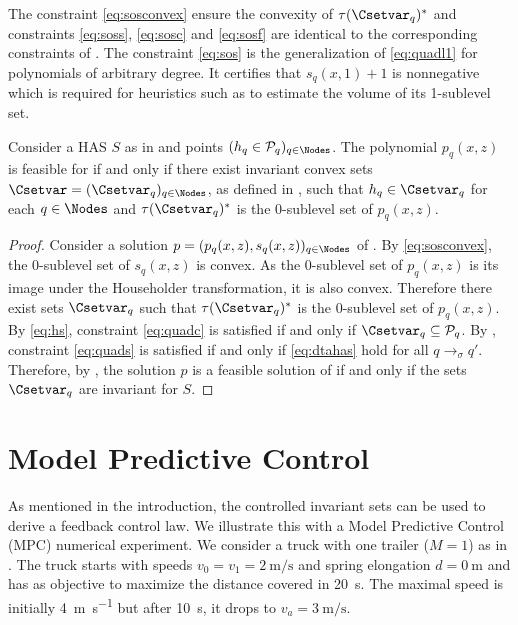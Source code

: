 \documentclass[11pt,twoside,a4paper,openright]{uclouvain-thesis}
\newcommand{\tr}{\to}
\newcommand{\trs}[1][\sigma]{\tr_{#1}}
\newcommand{\Ps}{\mathcal{P}}
\newcommand{\sys}{S}
\newcommand{\dtahas}{HAS}
\begin{document}
The constraint \eqref{eq:sosconvex} ensure the convexity of $\tau(\Csetvar_q)^*$
and constraints \eqref{eq:soss}, \eqref{eq:sosc} and \eqref{eq:sosf} are identical to the corresponding constraints of .
The constraint \eqref{eq:sos} is the generalization of \eqref{eq:quadl1} for polynomials
of arbitrary degree.
It certifies that $s_q(x, 1) + 1$ is nonnegative which is required
for heuristics such as \cite{magnani2005tractable, dabbene2017simple} to estimate
the volume of its 1-sublevel set.



\begin{mytheo}
  \label{theo:controlsos}
  Consider a \dtahas{} $\sys$ as in  and points $(h_q \in \Ps_q)_{q \in \Nodes}$.
  The polynomial $p_q(x, z)$ is feasible for  if and only if
  there exist invariant convex sets $\Csetvar = (\Csetvar_q)_{q \in \Nodes}$,
  as defined in ,
  such that $h_q \in \Csetvar_q$ for each $q \in \Nodes$
  and $\tau(\Csetvar_q)^*$ is the 0-sublevel set of $p_q(x, z)$.
  \begin{proof}
    Consider a solution $p = (p_q(x, z), s_q(x, z))_{q \in \Nodes}$ of .
    By \eqref{eq:sosconvex}, the 0-sublevel set of $s_q(x, z)$ is convex.
    As the 0-sublevel set of $p_q(x, z)$ is its image under the Householder
    transformation, it is also convex.
    Therefore there exist sets $\Csetvar_q$ such that $\tau(\Csetvar_q)^*$ is
    the 0-sublevel set of $p_q(x, z)$.
    By \eqref{eq:hs}, constraint \eqref{eq:quadc} is satisfied if and only if $\Csetvar_q \subseteq \Ps_q$.
    By , constraint \eqref{eq:quads} is satisfied if and only if
    \eqref{eq:dtahas} hold for all $q \trs q'$.
    Therefore, by , the solution $p$ is a feasible solution of  if and only if the sets $\Csetvar_q$ are invariant for $\sys$.
  \end{proof}
\end{mytheo}



\section{Model Predictive Control}
\label{sec:mpc}

As mentioned in the introduction, the controlled invariant sets can be used to derive a feedback control law.
We illustrate this with a Model Predictive Control (MPC) numerical experiment.
We consider a truck with one trailer ($M = 1$) as in .
The truck starts with speeds $v_0 = v_1 = \SI{2}{\meter\per\second}$ and spring elongation $d = \SI{0}{\meter}$
and has as objective to maximize the distance covered in \SI{20}{\second}.
The maximal speed is initially \SI{4}{\meter\per\second} but after \SI{10}{\second}, it drops to $v_a = \SI{3}{\meter\per\second}$.
\end{document}
